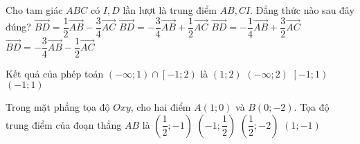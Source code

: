 \begin{ex}%
	Cho tam giác $ABC$ có $I, D$ lần lượt là trung điểm  $AB, CI$. Đẳng thức nào sau đây đúng?
	\choice
	{$\overrightarrow{BD}=\dfrac{1}{2}\overrightarrow{AB}-\dfrac{3}{4}\overrightarrow{AC}$}
	{\True $\overrightarrow{BD}=-\dfrac{3}{4}\overrightarrow{AB}+\dfrac{1}{2}\overrightarrow{AC}$} {$\overrightarrow{BD}=-\dfrac{1}{4}\overrightarrow{AB}+\dfrac{3}{2}\overrightarrow{AC}$} {$\overrightarrow{BD}=-\dfrac{3}{4}\overrightarrow{AB}-\dfrac{1}{2}\overrightarrow{AC}$}
\end{ex}
\begin{ex}%
	Kết quả của phép toán $\left(-\infty;1\right)\cap \left[-1;2\right)$ là
	\choice
	{$\left(1;2\right)$}
	{$\left(-\infty;2\right)$}
	{\True $\left[-1;1\right)$}
	{$\left(-1;1\right)$}
	\loigiai{Ta có $\left(-\infty;1\right)\cap \left[-1;2\right)=\left[-1;1\right).$
	}
\end{ex}

\begin{ex}%
	Trong mặt phẳng tọa độ $Oxy$, cho hai điểm $A\left(1;0\right)$ và $B\left(0;-2\right)$. Tọa độ trung điểm của đoạn thẳng $AB$ là
	\choice
	{\True $\left(\dfrac{1}{2};-1\right)$}
	{$\left(-1;\dfrac{1}{2}\right)$}
	{$\left(\dfrac{1}{2};-2\right)$}
	{$\left(1;-1\right)$}
\end{ex}

